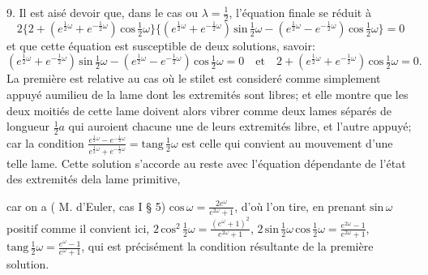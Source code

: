 \documentclass[11pt,a4paper]{article}
\begin{document}
9. Il est aisé devoir que, dans le cas ou $\lambda = \frac{1}{2}$, l'équation finale se réduit à
\[ 2\{2 + (e^{\frac{1}{2}\omega} + e^{-\frac{1}{2}\omega})\,\text{cos}\,\tfrac{1}{2}\omega\}\{(e^{\frac{1}{2}\omega} + e^{-\frac{1}{2}\omega})\,\text{sin}\,\tfrac{1}{2}\omega - (e^{\frac{1}{2}\omega} - e^{-\frac{1}{2}\omega})\,\text{cos}\,\tfrac{1}{2}\omega\} = 0 \]
et que cette équation est susceptible de deux solutions, savoir:
\[ (e^{\frac{1}{2}\omega} + e^{-\frac{1}{2}\omega})\,\text{sin}\,\tfrac{1}{2}\omega - (e^{\frac{1}{2}\omega} - e^{-\frac{1}{2}\omega})\,\text{cos}\,\tfrac{1}{2}\omega = 0 \quad\text{et}\quad 2 + (e^{\frac{1}{2}\omega} + e^{-\frac{1}{2}\omega})\,\text{cos}\,\tfrac{1}{2}\omega = 0. \]
La première est relative au cas où le stilet est consideré comme simplement
appuyé aumilieu de la lame dont les extremités sont libres; et elle montre que
les deux moitiés de cette lame doivent alors vibrer comme deux lames séparés
de longueur $\frac{1}{2}a$ qui auroient chacune une de leurs extremités libre, et l'autre
appuyé; car la condition $\frac{e^{\frac{1}{2}\omega} - e^{-\frac{1}{2}\omega}}{e^{\frac{1}{2}\omega} + e^{-\frac{1}{2}\omega}} = \text{tang}\,\tfrac{1}{2}\omega$ est celle qui convient au
mouvement d'une telle lame. Cette solution s'accorde au reste avec l'équation
dépendante de l'état des extremités dela lame primitive,


car on a ( M. d'Euler, cas I § 5) $\text{cos}\,\omega = \frac{2e^{\omega}}{e^{2\omega} + 1}$, d'où l'on tire, en prenant $\text{sin}\,\omega$
positif comme il convient ici, $2\,\text{cos}^2\,\tfrac{1}{2}\omega = \frac{(e^{\omega} + 1)^2}{e^{2\omega} + 1}$, $2\,\text{sin}\,\tfrac{1}{2}\omega\,\text{cos}\,\tfrac{1}{2}\omega = \frac{e^{2\omega} - 1}{e^{2\omega} + 1}$, $\text{tang}\,\tfrac{1}{2}\omega = \frac{e^{\omega} - 1}{e^{\omega} + 1}$,
qui est précisément la condition résultante de la première solution.
\end{document}
